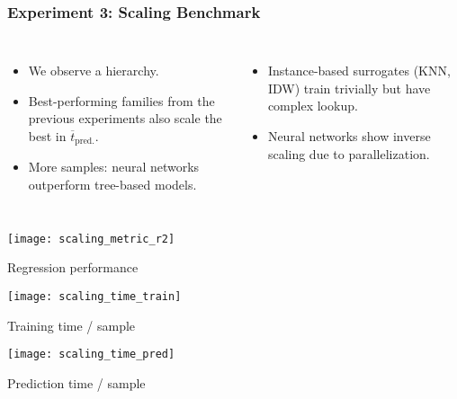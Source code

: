 \begin{frame}
	\frametitle{Experiment 3: Scaling Benchmark}
	\begin{columns}[T]
		\begin{itemize}
			\item
				We observe a hierarchy.
			\item
				Best-performing families from the previous experiments also scale the
				best in $\overline{t}_\text{pred.}$.
			\item
				More samples: neural networks outperform tree-based models.
		\end{itemize}

		\begin{itemize}
			\item
				Instance-based surrogates (KNN, IDW) train trivially but have
				complex lookup.
			\item
				Neural networks show inverse scaling due to
				parallelization.
		\end{itemize}
	\end{columns}

	\vspace{1em}

	\begin{minipage}{0.32\textwidth}
		\texttt{[image: scaling\_metric\_r2]}
		\begin{center}
			\footnotesize
			\vspace{-10pt}
			\hspace{5pt} Regression performance
		\end{center}
	\end{minipage}
	\begin{minipage}{0.32\textwidth}
		\texttt{[image: scaling\_time\_train]}
		\begin{center}
			\footnotesize
			\vspace{-10pt}
			\hspace{5pt} Training time / sample
		\end{center}
	\end{minipage}
	\begin{minipage}{0.32\textwidth}
		\texttt{[image: scaling\_time\_pred]}
		\begin{center}
			\footnotesize
			\vspace{-10pt}
			\hspace{5pt} Prediction time / sample
		\end{center}
	\end{minipage}

\end{frame}

